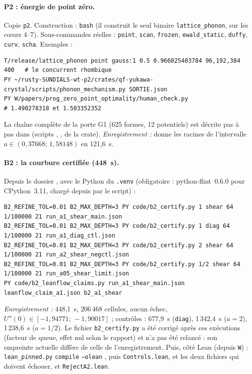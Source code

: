 \paragraph{P2 : énergie de point zéro.} Copie \texttt{p2}. Construction :
\texttt{bash}  (il construit le seul binaire \texttt{lattice\_phonon}, sur les
cœurs 4--7). Sous-commandes réelles : \texttt{point}, \texttt{scan}, \texttt{frozen}, \texttt{ewald\_static},
\texttt{duffy}, \texttt{curv}, \texttt{scha}. Exemples :
\begin{lstlisting}[style=appC,language={}]
T/release/lattice_phonon point gauss:1 0.5 0.966025403784 96,192,384 400   # le concurrent rhombique
PY ~/rusty-SUNDIALS-wt-p2/crates/qf-yukawa-crystal/scripts/phonon_mechanism.py SORTIE.json
PY W/papers/prog_zero_point_optimality/human_check.py                       # 1.490278318 et 1.503352352
\end{lstlisting}
La chaîne complète de la porte G1 (625 formes, 12 potentiels) est décrite pas à pas dans
 (scripts , ,
 de la crate). \emph{Enregistrement :}  donne les racines de
l'intervalle $a\in(0{,}37668;\,1{,}58148)$ en 121,6~s.

\paragraph{B2 : la courbure certifiée (448~s).} Depuis le dossier , avec le
Python du \texttt{.venv} (obligatoire : python-flint~0.6.0 pour CPython~3.11, chargé depuis 
par le script) :
\begin{lstlisting}[style=appC,language={}]
B2_REFINE_TOL=0.01 B2_MAX_DEPTH=3 PY code/b2_certify.py 1 shear 64 1/100000 21 run_a1_shear_main.json
B2_REFINE_TOL=0.01 B2_MAX_DEPTH=3 PY code/b2_certify.py 1 diag 64 1/100000 21 run_a1_diag_ctl.json
B2_REFINE_TOL=0.01 B2_MAX_DEPTH=3 PY code/b2_certify.py 2 shear 64 1/100000 21 run_a2_shear_negctl.json
B2_REFINE_TOL=0.01 B2_MAX_DEPTH=3 PY code/b2_certify.py 1/2 shear 64 1/100000 21 run_a05_shear_limit.json
PY code/b2_leanflow_claims.py run_a1_shear_main.json leanflow_claim_a1.json b2_a1_shear
\end{lstlisting}
\emph{Enregistrement :} 448,1~s, 206\,468 cellules, aucun échec, $U''(0)\in[-1{,}94771;\,-1{,}90017]$ ; contrôles :
677,9~s (\texttt{diag}), 1\,342,4~s ($a=2$), 1\,238,6~s ($a=1/2$). Le fichier \texttt{b2\_certify.py} a été corrigé
après ces exécutions (facteur de queue, effet nul selon le rapport) et n'a pas été relancé : son empreinte actuelle
diffère de celle de l'enregistrement. Puis, côté Lean (depuis \texttt{W}) :
\texttt{lean\_pinned.py} \texttt{compile}  \texttt{--olean} ,
puis \texttt{Controls.lean}, et les deux fichiers qui doivent échouer,  et
\texttt{RejectA2.lean}.

